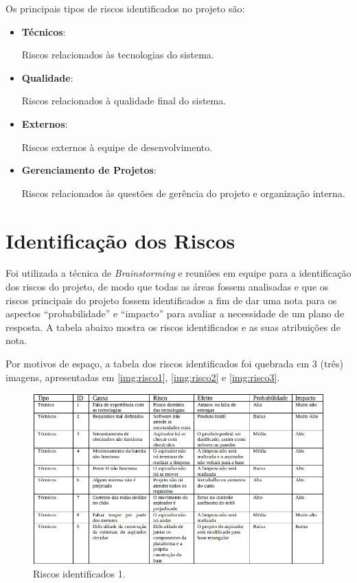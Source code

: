 	Os principais tipos de riscos identificados no projeto são:

	\begin{itemize}
		\item \textbf{Técnicos}: 
			
			Riscos relacionados às tecnologias do sistema.

		\item \textbf{Qualidade}: 
			
			Riscos relacionados à qualidade final do sistema.

		\item \textbf{Externos}:

			Riscos externos à equipe de desenvolvimento.

		\item \textbf{Gerenciamento de Projetos}:

			Riscos relacionados às questões de gerência do projeto e organização interna.
	
	\end{itemize}

\section{Identificação dos Riscos} %
\label{sec:identificação_dos_riscos}
	
	Foi utilizada a técnica de \textit{Brainstorming} e reuniões em equipe para a identificação dos riscos do projeto, de modo que todas as áreas fossem analisadas e que os riscos principais do projeto fossem identificados a fim de dar uma nota para os aspectos “probabilidade” e “impacto” para avaliar a necessidade de um plano de resposta. A tabela abaixo mostra os riscos identificados e as suas atribuições de nota.

	Por motivos de espaço, a tabela dos riscos identificados foi quebrada em 3 (três) imagens, apresentadas em \ref{img:risco1}, \ref{img:risco2} e \ref{img:risco3}.

	\begin{figure}[H]
		\centering
		\includegraphics[scale=0.6]{figuras/riscos1.png}
		\caption{Riscos identificados 1.}
		\label{img:ear}
	\end{figure}


